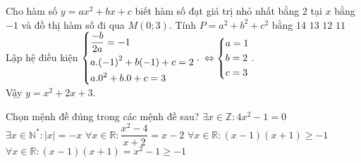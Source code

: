 \begin{ex}%
Cho hàm số $y=ax^2+bx+c$ biết hàm số đạt giá trị nhỏ nhất bằng $2$ tại $x$ bằng $-1$ và đồ thị hàm số đi qua $M(0;3 )$. Tính $P=a^2+b^2+{{c}^2}$ bằng
\choice
{\True $14$}
{$13$}
{$12$}
{$11$}
\loigiai
{Lập hệ điều kiện $\left\{\begin{aligned}& \dfrac{-b}{2a}=-1 \\
		& a.{{(-1)}^2}+b(-1)+c=2 \\
		& a{{.0}^2}+b.0+c=3 \\
	\end{aligned}\right..$ $\Leftrightarrow \left\{\begin{aligned}& a=1 \\
		& b=2 \\
		& c=3 \\
	\end{aligned}\right..$\\
 Vậy $y=x^2+2x+3$.}
\end{ex}
\begin{ex}%
Chọn mệnh đề đúng trong các mệnh đề sau?
\choice
{$\exists x\in \mathbb{Z}:4x^2-1=0$}
{$\exists x\in {{\mathbb{N}}^{*}}:\left| x \right|=-x$}  { $\forall x\in \mathbb{R}:\dfrac{x^2-4}{x+2}=x-2$}
{\True $\forall x\in \mathbb{R}:(x-1 )(x+1 )\ge -1$}
\loigiai
{$\forall x\in \mathbb{R}:(x-1 )(x+1 )=x^2-1\ge -1$}
\end{ex}

